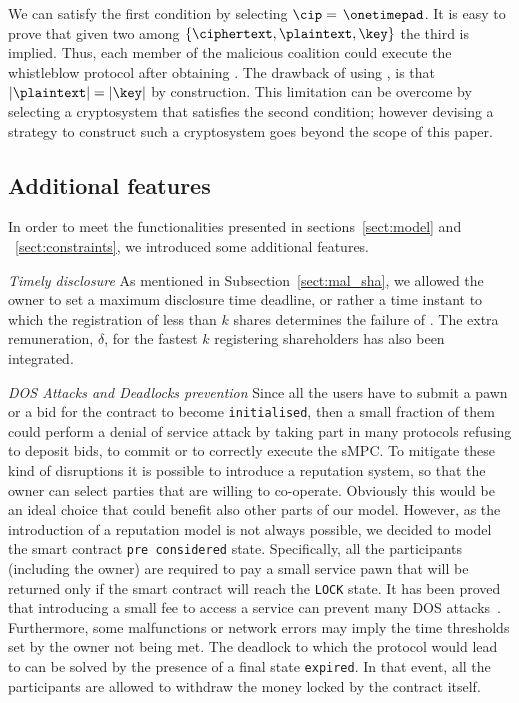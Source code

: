 We can satisfy the first condition by selecting $ \mathcal{\cip}=$$ \text{ }\onetimepad$. 
It is easy to prove that given two among $\{ \ciphertext , \plaintext , \key \}$ the third is implied. 
Thus, each member of the malicious coalition could execute the whistleblow protocol after obtaining \plaintext. 
The drawback of using \onetimepad, is that $|\plaintext| = |\key|$ by construction. 
This limitation can be overcome by selecting a cryptosystem that satisfies the second condition; however devising a strategy to construct such a cryptosystem goes beyond the scope of this paper.

\subsection{Additional features}

In order to meet the functionalities presented in sections~\ref{sect:model} and ~\ref{sect:constraints}, we introduced some additional features.  

\begin{compactitem}
	
	\item {\em Timely disclosure} As mentioned in Subsection~\ref{sect:mal_sha}, we allowed the owner to set a maximum disclosure time deadline, or rather a time instant to which the registration of less than $k$ shares determines the failure of \shortname. The extra remuneration, $\delta$, for the fastest $k$ registering shareholders has also been integrated. 
	
	\item {\em DOS Attacks and Deadlocks prevention} Since all the users have to submit a pawn or a bid for the contract to become \texttt{initialised}, then a small fraction of them could perform a denial of service attack by taking part in many \shortname protocols refusing to deposit bids, to commit or to correctly execute the sMPC. 
	To mitigate these kind of disruptions it is possible to introduce a reputation system, so that the owner can select parties that are willing to co-operate. 
	Obviously this would be an ideal choice that could benefit also other parts of our model. However, as the introduction of a reputation model is not always possible, we decided to model the smart contract \texttt{pre considered} state. 
	Specifically, all the participants (including the owner) are required to pay a small service pawn that will be returned only if the smart contract will reach the \texttt{LOCK} state. 
	It has been proved that introducing a small fee to access a service can prevent many DOS attacks~\cite{ddos-payments,ddos-survey}. 
	Furthermore, some malfunctions or network errors may imply the time thresholds set by the owner not being met.
	The deadlock to which the protocol would lead to can be solved by the presence of a final state \texttt{expired}. 
	In that event, all the participants are allowed to withdraw the money locked by the contract itself.  
	
\end{compactitem}

